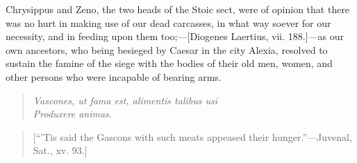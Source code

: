 \documentclass[twocolumn]{article}
\begin{document}
	Chrysippus and Zeno, the two heads of the Stoic sect, were of opinion that there was no hurt in making use of our dead carcasses, in what way soever for our necessity, and in feeding upon them too;---[Diogenes Laertius, vii. 188.]---as our own ancestors, who being besieged by Caesar in the city Alexia, resolved to sustain the famine of the siege with the bodies of their old men, women, and other persons who were incapable of bearing arms.

	\begin{quote}
		\noindent\emph{Vascones, ut fama est, alimentis talibus usi}\\
		\emph{Produxere animas.}
	\end{quote}
	
	\begin{quote}
		[``'Tis said the Gascons with such meats appeased their hunger.''---Juvenal, Sat., xv. 93.]
	\end{quote}
\end{document}
